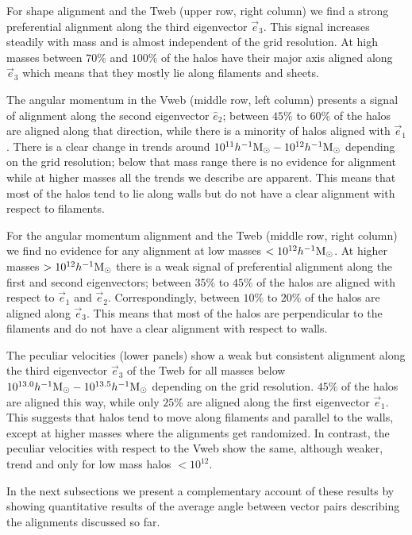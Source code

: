 \documentclass[useAMS,usenatbib]{mn2e}
\newcommand{\hMsun}{{\ifmmode{h^{-1}{\rm
        {M_{\odot}}}}\else{$h^{-1}{\rm{M_{\odot}}}$~}\fi}}
\begin{document}
For shape alignment and the Tweb (upper row, right column) we find a strong
preferential alignment along the third eigenvector $\vec{e}_{3}$. This
signal increases steadily with mass and is almost independent of the
grid resolution. At high masses between $70\%$ and $100\%$ of the
halos have their major axis aligned along $\vec{e}_{3}$ which means
that they mostly lie along filaments and sheets.

The angular momentum in the Vweb (middle row, left column) presents 
a signal of alignment along the second eigenvector $\hat{e}_{2}$;
between $45\%$ to $60\%$ of the halos are aligned along that
direction, while there is a minority of halos aligned with
$\vec{e}_{1}$.  There is a clear change in trends around
$10^{11}\hMsun-10^{12}\hMsun$ depending on the grid resolution;
below that mass range there is no evidence for alignment while at
higher masses all the trends we describe are apparent. This means that most
of the halos tend to lie along walls but do not have a clear alignment
with respect to filaments.

For the angular momentum alignment and the Tweb (middle row, right
column) we find no evidence for any alignment at low masses $<10^{12}\hMsun$.
At higher masses $>10^{12}\hMsun$ there is a weak signal
of preferential alignment along the first and second eigenvectors;
between $35\%$ to $45\%$ of the halos are aligned with respect to
$\vec{e}_1$ and $\vec{e}_2$. Correspondingly, between $10\%$ to $20\%$
of the halos are aligned along $\vec{e}_{3}$. This means
that most of the halos are perpendicular to the filaments and do not
have a clear alignment with respect to walls.

The peculiar velocities (lower panels) show a weak but consistent alignment along the
third eigenvector $\vec{e}_{3}$ of the Tweb for all masses below
$10^{13.0}\hMsun-10^{13.5}\hMsun$ depending on the grid
resolution. $45\%$ of the halos are aligned this way, while only $25\%$ are
aligned along the first eigenvector $\vec{e}_1$. This suggests that
halos tend to move along filaments and parallel to the walls, except
at higher masses where the alignments get randomized.  In contrast,
the peculiar velocities with respect to the Vweb show the same, although weaker, trend
and only for low mass halos $<10^{12}$.


In the next subsections we present a complementary account of these
results by showing quantitative results of the average angle
between vector pairs describing the alignments discussed so far.
\end{document}
